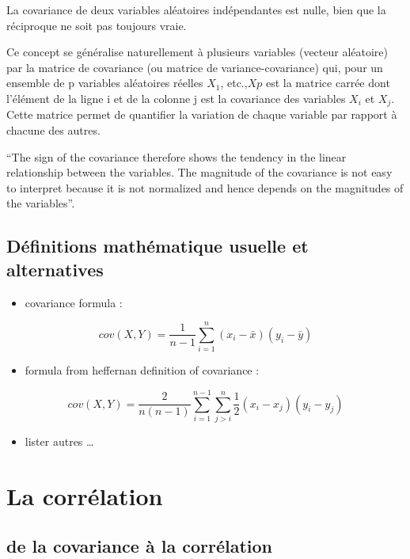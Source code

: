 \documentclass[
]{report}
\providecommand{\tightlist}{%
  \setlength{\itemsep}{0pt}\setlength{\parskip}{0pt}}
\begin{document}
La covariance de deux variables aléatoires indépendantes est nulle, bien que la réciproque ne soit pas toujours vraie.

Ce concept se généralise naturellement à plusieurs variables (vecteur aléatoire) par la matrice de covariance (ou matrice de variance-covariance) qui, pour un ensemble de p variables aléatoires réelles \(X_1\), etc.,\(Xp\) est la matrice carrée dont l'élément de la ligne i et de la colonne j est la covariance des variables \(X_i\) et \(X_j\). Cette matrice permet de quantifier la variation de chaque variable par rapport à chacune des autres.

``The sign of the covariance therefore shows the tendency in the linear relationship between the variables. The magnitude of the covariance is not easy to interpret because it is not normalized and hence depends on the magnitudes of the variables''.

\hypertarget{duxe9finitions-mathuxe9matique-usuelle-et-alternatives}{%
\section{Définitions mathématique usuelle et alternatives}\label{duxe9finitions-mathuxe9matique-usuelle-et-alternatives}}

\begin{itemize}
\tightlist
\item
  covariance formula :
\end{itemize}

\[cov(X,Y) = \frac{1}{n-1}\sum_{i=1}^{n}(x_i - \bar{x})(y_i - \bar{y}) \]

\begin{itemize}
\tightlist
\item
  formula from heffernan definition of covariance :
\end{itemize}

\[cov(X,Y)= \frac{2}{n(n-1)}\sum_{i=1}^{n-1}\sum_{j>i}^{n}\frac{1}{2}(x_i-x_j)(y_i - y_j)\]

\begin{itemize}
\tightlist
\item
  lister autres \ldots{}
\end{itemize}

\hypertarget{la-corruxe9lation}{%
\chapter{La corrélation}\label{la-corruxe9lation}}

\hypertarget{de-la-covariance-uxe0-la-corruxe9lation}{%
\section{de la covariance à la corrélation}\label{de-la-covariance-uxe0-la-corruxe9lation}}
\end{document}
